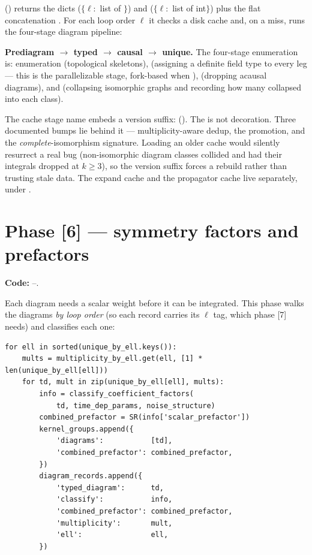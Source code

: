  () returns the
dicts  ($\{\ell:$ list of $\}$) and
 ($\{\ell:$ list of int$\}$) plus the flat
concatenation . For each loop order $\ell$ it checks a disk
cache and, on a miss, runs the four-stage diagram pipeline:

\begin{defn}
\textbf{Prediagram $\to$ typed $\to$ causal $\to$ unique.}
The four-stage enumeration is:  enumeration (topological
skeletons),  (assigning a definite field type to every
leg --- this is the parallelizable stage, fork-based when ),
 (dropping acausal diagrams), and
 (collapsing isomorphic graphs and
recording how many collapsed into each class).
\end{defn}

\begin{gotcha}
The cache stage name embeds a version suffix: 
(). The  is not decoration. Three
documented bumps lie behind it --- multiplicity-aware dedup, the
 promotion, and the \emph{complete}-isomorphism signature.
Loading an older cache would silently resurrect a real bug (non-isomorphic
diagram classes collided and had their integrals dropped at $k\ge3$), so the
version suffix forces a rebuild rather than trusting stale data. The expand cache
and the propagator cache live separately, under .
\end{gotcha}

\section{Phase [6] --- symmetry factors and prefactors}\label{sec:co-classify}

\textbf{Code:} --.

Each diagram needs a scalar weight before it can be integrated. This phase walks
the diagrams \emph{by loop order} (so each record carries its $\ell$ tag, which
phase [7] needs) and classifies each one:

\begin{lstlisting}
for ell in sorted(unique_by_ell.keys()):
    mults = multiplicity_by_ell.get(ell, [1] * len(unique_by_ell[ell]))
    for td, mult in zip(unique_by_ell[ell], mults):
        info = classify_coefficient_factors(
            td, time_dep_params, noise_structure)
        combined_prefactor = SR(info['scalar_prefactor'])
        kernel_groups.append({
            'diagrams':           [td],
            'combined_prefactor': combined_prefactor,
        })
        diagram_records.append({
            'typed_diagram':      td,
            'classify':           info,
            'combined_prefactor': combined_prefactor,
            'multiplicity':       mult,
            'ell':                ell,
        })
\end{lstlisting}

